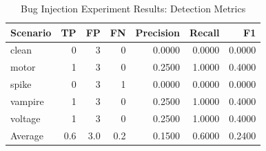 
\begin{table}[h]
\centering
\caption{Bug Injection Experiment Results: Detection Metrics}
\label{tab:bug_injection_metrics}
\begin{tabular}{lrrrrrr}
\toprule
\textbf{Scenario} & \textbf{TP} & \textbf{FP} & \textbf{FN} & \textbf{Precision} & \textbf{Recall} & \textbf{F1} \\
\midrule
clean                & 0 & 3 & 0 & 0.0000 & 0.0000 & 0.0000 \\
motor                & 1 & 3 & 0 & 0.2500 & 1.0000 & 0.4000 \\
spike                & 0 & 3 & 1 & 0.0000 & 0.0000 & 0.0000 \\
vampire              & 1 & 3 & 0 & 0.2500 & 1.0000 & 0.4000 \\
voltage              & 1 & 3 & 0 & 0.2500 & 1.0000 & 0.4000 \\
\midrule
Average              & 0.6 & 3.0 & 0.2 & 0.1500 & 0.6000 & 0.2400 \\

\bottomrule
\end{tabular}
\end{table}
